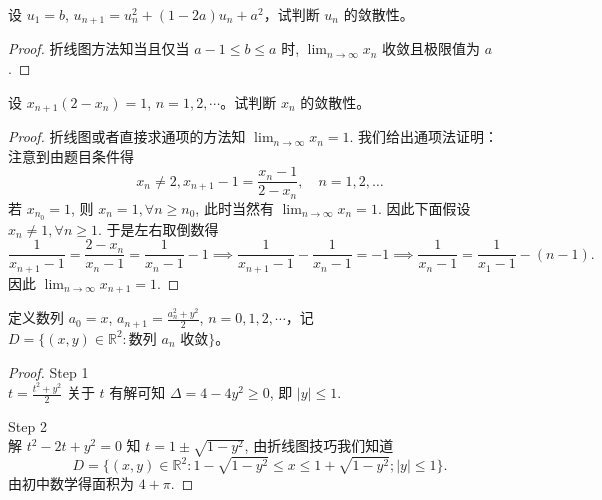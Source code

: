 \documentclass[lang=cn,10pt,thmcnt=section]{elegantbook}
\begin{document}
\begin{example}
	设 \( u_1 = b \), \( u_{n+1} = u_n^2 + (1 - 2a)u_n + a^2 \)，试判断 \( u_n \) 的敛散性。
\end{example}
\begin{proof}
	折线图方法知当且仅当 $a-1 \le b \le a$ 时, $\lim_{n \to \infty} x_n$ 收敛且极限值为 $a$.
\end{proof}
\begin{example}
	设 \( x_{n+1}(2 - x_n) = 1 \), \( n = 1, 2, \cdots \)。试判断 \( x_n \) 的敛散性。
\end{example}
\begin{proof}
	折线图或者直接求通项的方法知 $\lim_{n \to \infty} x_n = 1$. 我们给出通项法证明：
    注意到由题目条件得
    $$
    x_n \ne 2, x_{n+1} - 1 = \frac{x_n - 1}{2 - x_n}, \quad n = 1, 2, \dots
    $$
    若 $x_{n_0} = 1$, 则 $x_n = 1, \forall n \ge n_0$, 此时当然有 $\lim_{n \to \infty} x_n = 1$. 因此下面假设 $x_n \ne 1, \forall n \ge 1$. 于是左右取倒数得
    $$
    \frac{1}{x_{n+1} - 1} = \frac{2 - x_n}{x_n - 1} = \frac{1}{x_n - 1} - 1 \implies \frac{1}{x_{n+1} - 1} - \frac{1}{x_n - 1} = -1 \implies \frac{1}{x_n - 1} = \frac{1}{x_1 - 1} - (n-1).
    $$
    因此 $\lim_{n \to \infty} x_{n+1} = 1$.
\end{proof}
\begin{example}
	定义数列 \( a_0 = x \), \( a_{n+1} = \frac{a_n^2 + y^2}{2} \), \( n = 0, 1, 2, \cdots \)，记 \( D = \{(x, y) \in \mathbb{R}^2 : \text{数列 } a_n \text{ 收敛}\} \)。
\end{example}
\begin{proof}
	Step 1 \\
    $t = \frac{t^2+y^2}{2}$ 关于 $t$ 有解可知 $\Delta = 4 - 4y^2 \ge 0$, 即 $|y| \le 1$.

    Step 2 \\
    解 $t^2 - 2t + y^2 = 0$ 知 $t = 1 \pm \sqrt{1 - y^2}$, 由折线图技巧我们知道
    $$
    D = \{(x, y) \in \mathbb{R}^2 : 1 - \sqrt{1 - y^2} \le x \le 1 + \sqrt{1 - y^2}; |y| \le 1\}.
    $$
    由初中数学得面积为 $4 + \pi$. %

\end{proof}
\end{document}
